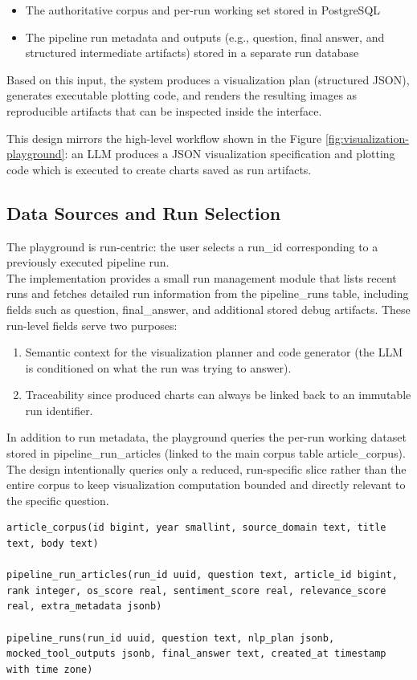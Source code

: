 \begin{itemize}
    \item The authoritative corpus and per-run working set stored in PostgreSQL
    \item The pipeline run metadata and outputs (e.g., question, final answer, and structured intermediate artifacts) stored in a separate run database
\end{itemize}

Based on this input, the system produces a visualization plan (structured JSON), generates executable plotting code, and renders the resulting images as reproducible artifacts that can be inspected inside the interface.

This design mirrors the high-level workflow shown in the Figure \ref{fig:visualization-playground}: an LLM produces a JSON visualization specification and plotting code which is executed to create charts saved as run artifacts.

\subsection{Data Sources and Run Selection}

The playground is run-centric: the user selects a run\_id corresponding to a previously executed pipeline run. \\
The implementation provides a small run management module that lists recent runs and fetches detailed run information from the pipeline\_runs table, including fields such as question, final\_answer, and additional stored debug artifacts. These run-level fields serve two purposes:

\begin{enumerate}
    \item Semantic context for the visualization planner and code generator (the LLM is conditioned on what the run was trying to answer).
    \item Traceability since produced charts can always be linked back to an immutable run identifier.
\end{enumerate}

In addition to run metadata, the playground queries the per-run working dataset stored in pipeline\_run\_articles (linked to the main corpus table article\_corpus). The design intentionally queries only a reduced, run-specific slice rather than the entire corpus to keep visualization computation bounded and directly relevant to the specific question.

\begin{lstlisting}[caption={Example DB schema summary}, label={lst:db-schema}]
article_corpus(id bigint, year smallint, source_domain text, title text, body text)

pipeline_run_articles(run_id uuid, question text, article_id bigint, rank integer, os_score real, sentiment_score real, relevance_score real, extra_metadata jsonb)

pipeline_runs(run_id uuid, question text, nlp_plan jsonb, mocked_tool_outputs jsonb, final_answer text, created_at timestamp with time zone)
\end{lstlisting}

